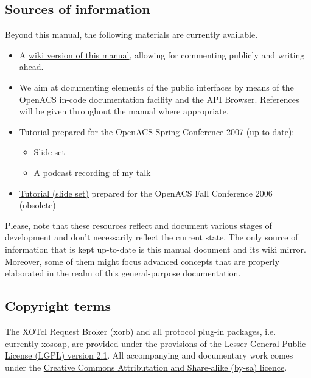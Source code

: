 \subsection{Sources of information}
Beyond this manual, the following materials are currently available.
\begin{itemize}
\item A \href{http://openacs-dotlrn.wu-wien.ac.at}{wiki version of this manual}, allowing for commenting publicly and writing ahead.
\item We aim at documenting elements of the public interfaces by means of the OpenACS in-code documentation facility and the API Browser. References will be given throughout the manual where appropriate.
\item Tutorial prepared for the \href{http://oacs-dotlrn-conf2007.wu-wien.ac.at/}{OpenACS Spring Conference 2007} (up-to-date):
\begin{itemize} 
\item \href{http://oacs-dotlrn-conf2007.wu-wien.ac.at/conf2007/file/sobernig-xosoap-slides.pdf?m=download|Slide set}{Slide set}
\item A \href{http://oacs-dotlrn-conf2007.wu-wien.ac.at/conf2007/file/tutorial-sobernig.mp4?m=download}{podcast recording} of my talk
\end{itemize}
\item \href{http://nm.wu-wien.ac.at/research/publications/b670.pdf}{Tutorial (slide set)} prepared for the OpenACS Fall Conference 2006 (obsolete) 
\end{itemize}
Please, note that these resources reflect and document various stages of development and don't necessarily reflect the current state. The only source of information that is kept up-to-date is this manual document and its wiki mirror. Moreover, some of them might focus advanced concepts that are properly elaborated in the realm of this general-purpose documentation.
\subsection{Copyright terms}
The XOTcl Request Broker (xorb) and all protocol plug-in packages, i.e. currently xosoap, are provided under the provisions of the \href{http://creativecommons.org/licenses/LGPL/2.1/}{Lesser General Public License (LGPL) version 2.1}. All accompanying and documentary work comes under the \href{http://creativecommons.org/licenses/by-sa/2.0/at/}{Creative Commons Attributation and Share-alike (by-sa) licence}.

